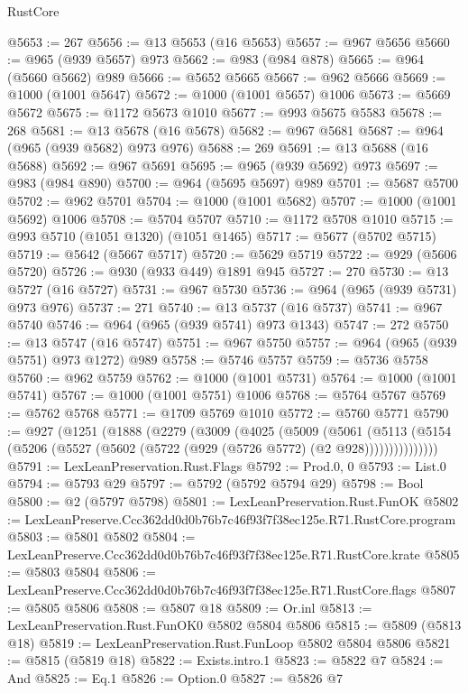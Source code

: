 \begin{lexlean}{RustCore}
\begin{coremodule}
@5653 := 267
@5656 := @13 @5653 (@16 @5653)
@5657 := @967 @5656
@5660 := @965 (@939 @5657) @973
@5662 := @983 (@984 @878)
@5665 := @964 (@5660 @5662) @989
@5666 := @5652 @5665
@5667 := @962 @5666
@5669 := @1000 (@1001 @5647)
@5672 := @1000 (@1001 @5657) @1006
@5673 := @5669 @5672
@5675 := @1172 @5673 @1010
@5677 := @993 @5675 @5583
@5678 := 268
@5681 := @13 @5678 (@16 @5678)
@5682 := @967 @5681
@5687 := @964 (@965 (@939 @5682) @973 @976)
@5688 := 269
@5691 := @13 @5688 (@16 @5688)
@5692 := @967 @5691
@5695 := @965 (@939 @5692) @973
@5697 := @983 (@984 @890)
@5700 := @964 (@5695 @5697) @989
@5701 := @5687 @5700
@5702 := @962 @5701
@5704 := @1000 (@1001 @5682)
@5707 := @1000 (@1001 @5692) @1006
@5708 := @5704 @5707
@5710 := @1172 @5708 @1010
@5715 := @993 @5710 (@1051 @1320) (@1051 @1465)
@5717 := @5677 (@5702 @5715)
@5719 := @5642 (@5667 @5717)
@5720 := @5629 @5719
@5722 := @929 (@5606 @5720)
@5726 := @930 (@933 @449) @1891 @945
@5727 := 270
@5730 := @13 @5727 (@16 @5727)
@5731 := @967 @5730
@5736 := @964 (@965 (@939 @5731) @973 @976)
@5737 := 271
@5740 := @13 @5737 (@16 @5737)
@5741 := @967 @5740
@5746 := @964 (@965 (@939 @5741) @973 @1343)
@5747 := 272
@5750 := @13 @5747 (@16 @5747)
@5751 := @967 @5750
@5757 := @964 (@965 (@939 @5751) @973 @1272) @989
@5758 := @5746 @5757
@5759 := @5736 @5758
@5760 := @962 @5759
@5762 := @1000 (@1001 @5731)
@5764 := @1000 (@1001 @5741)
@5767 := @1000 (@1001 @5751) @1006
@5768 := @5764 @5767
@5769 := @5762 @5768
@5771 := @1709 @5769 @1010
@5772 := @5760 @5771
@5790 := @927
    (@1251
      (@1888
        (@2279
          (@3009
            (@4025
              (@5009
                (@5061
                  (@5113
                    (@5154 (@5206 (@5527 (@5602 (@5722 (@929 (@5726 @5772) (@2 @928)))))))))))))))
@5791 := LexLeanPreservation.Rust.Flags
@5792 := Prod.{0, 0}
@5793 := List.{0}
@5794 := @5793 @29
@5797 := @5792 (@5792 @5794 @29)
@5798 := Bool
@5800 := @2 (@5797 @5798)
@5801 := LexLeanPreservation.Rust.FunOK
@5802 := LexLeanPreserve.Ccc362dd0d0b76b7c46f93f7f38ec125e.R71.RustCore.program
@5803 := @5801 @5802
@5804 := LexLeanPreserve.Ccc362dd0d0b76b7c46f93f7f38ec125e.R71.RustCore.krate
@5805 := @5803 @5804
@5806 := LexLeanPreserve.Ccc362dd0d0b76b7c46f93f7f38ec125e.R71.RustCore.flags
@5807 := @5805 @5806
@5808 := @5807 @18
@5809 := Or.inl
@5813 := LexLeanPreservation.Rust.FunOK0 @5802 @5804 @5806
@5815 := @5809 (@5813 @18)
@5819 := LexLeanPreservation.Rust.FunLoop @5802 @5804 @5806
@5821 := @5815 (@5819 @18)
@5822 := Exists.intro.{1}
@5823 := @5822 @7
@5824 := And
@5825 := Eq.{1}
@5826 := Option.{0}
@5827 := @5826 @7

\end{coremodule}
\end{lexlean}

